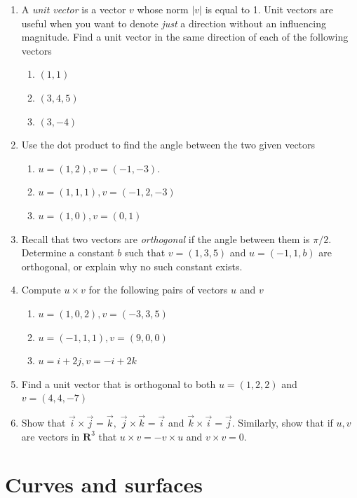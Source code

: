 \documentclass[12pt]{article}
\numberwithin{equation}{subsection}
\numberwithin{figure}{subsection}
\theoremstyle{note}
\begin{document}
{\begin{enumerate}[label=\arabic*.]
\item A \textit{unit vector} is a vector $v$ whose norm $|v|$ is equal to 1. Unit vectors are useful when you want to denote \textit{just} a direction without an influencing magnitude. Find a unit vector in the same direction of each of the following vectors

\begin{enumerate}
	\item $(1,1)$
	\item $(3,4,5)$
	\item $(3,-4)$
\end{enumerate}

\item Use the dot product to find the angle between the two given vectors

\begin{enumerate}
	\item $u=(1,2), v=(-1,-3)$.
	\item $u=(1,1,1), v=(-1,2,-3)$
	\item $u=(1,0), v=(0,1)$
\end{enumerate}

\item Recall that two vectors are \textit{orthogonal} if the angle between them is $\pi/2$. Determine a constant $b$ such that $v=(1,3,5)$ and $u=(-1,1,b)$ are orthogonal, or explain why no such constant exists. 

\item Compute $u\times v$ for the following pairs of vectors $u$ and $v$
\begin{enumerate}
	\item $u=(1,0,2), v=(-3,3,5)$
	\item $u=(-1,1,1), v=(9,0,0)$
	\item $u=i+2j, v=-i+2k$
\end{enumerate}

\item Find a unit vector that is orthogonal to both $u=(1,2,2)$ and $v=(4,4,-7)$

\item Show that $\vec{i}\times \vec{j}=\vec{k}, \; \vec{j}\times \vec{k}=\vec{i}$ and $\vec{k}\times \vec{i}=\vec{j}$. Similarly, show that if $u,v$ are vectors in $\mathbf{R}^3$ that $u\times v=-v\times u$ and $v\times v=0$.
\end{enumerate}

\section{Curves and surfaces} \label{sec-curves-surf}

}
\end{document}
